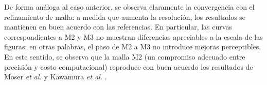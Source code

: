 De forma análoga al caso anterior, se observa claramente la convergencia con el refinamiento de malla: a medida que aumenta la resolución, los resultados se mantienen en buen acuerdo con las referencias. En particular, las curvas correspondientes a M2 y M3 no muestran diferencias apreciables a la escala de las figuras; en otras palabras, el paso de M2 a M3 no introduce mejoras perceptibles. En este sentido, se observa que la malla M2 (un compromiso adecuado entre precisión y costo computacional) reproduce con buen acuerdo los resultados de Moser \textit{et al.} \cite{moser1999} y Kawamura \textit{et al.} \cite{kawamura2000dns}.

\newpage

\begin{figure}[H]
 \centering


\end{figure}
